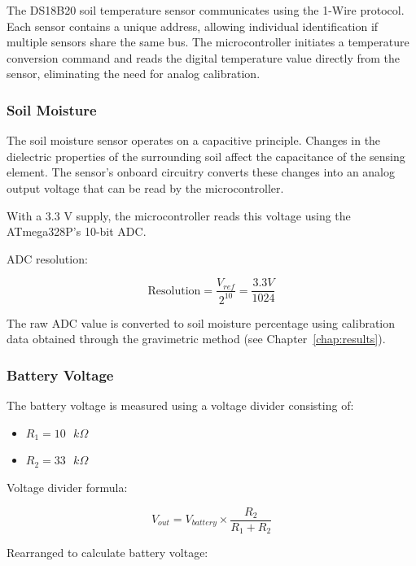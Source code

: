 The DS18B20 soil temperature sensor communicates using the 1-Wire
protocol. Each sensor contains a unique address, allowing individual
identification if multiple sensors share the same bus. The
microcontroller initiates a temperature conversion command and reads the
digital temperature value directly from the sensor, eliminating the need
for analog calibration.

\subsubsection{Soil Moisture}

The soil moisture sensor operates on a capacitive principle. Changes in the dielectric properties of the surrounding soil affect the capacitance of the sensing element. The sensor's onboard circuitry converts these changes into an analog output voltage that can be read by the microcontroller.

With a 3.3 V supply, the microcontroller reads this voltage using the ATmega328P's 10-bit ADC.

ADC resolution:

\begin{equation}
\text{Resolution} = \frac{V_{ref}}{2^{10}} = \frac{3.3V}{1024}
\label{eq:adc-resolution}
\end{equation}

The raw ADC value is converted to soil moisture percentage using
calibration data obtained through the gravimetric method (see
Chapter~\ref{chap:results}).

\subsubsection{Battery Voltage}

The battery voltage is measured using a voltage divider consisting of:

\begin{itemize}
\item
  \(R_{1} = 10\text{ }k\Omega\)
\item
  \(R_{2} = 33\text{ }k\Omega\)
\end{itemize}

Voltage divider formula:

\begin{equation}
V_{out} = V_{battery} \times \frac{R_{2}}{R_{1} + R_{2}}
\label{eq:voltage-divider}
\end{equation}

Rearranged to calculate battery voltage:

